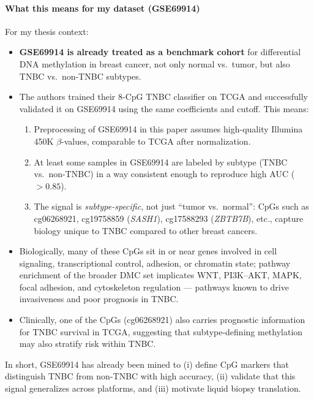 \documentclass[10pt]{extarticle}
\begin{document}
\paragraph{What this means for my dataset (GSE69914)}
For my thesis context:
\begin{itemize}[label=-]
    \item \textbf{GSE69914 is already treated as a benchmark cohort} for differential DNA methylation in breast cancer, not only normal vs.\ tumor, but also TNBC vs.\ non-TNBC subtypes.
    \item The authors trained their 8-CpG TNBC classifier on TCGA and successfully validated it on GSE69914 using the same coefficients and cutoff. This means:
    \begin{enumerate}
        \item Preprocessing of GSE69914 in this paper assumes high-quality Illumina 450K \(\beta\)-values, comparable to TCGA after normalization.
        \item At least some samples in GSE69914 are labeled by subtype (TNBC vs.\ non-TNBC) in a way consistent enough to reproduce high AUC (\(>0.85\)).
        \item The signal is \textit{subtype-specific}, not just ``tumor vs.\ normal'': CpGs such as cg06268921, cg19758859 (\textit{SASH1}), cg17588293 (\textit{ZBTB7B}), etc., capture biology unique to TNBC compared to other breast cancers.
    \end{enumerate}
    \item Biologically, many of these CpGs sit in or near genes involved in cell signaling, transcriptional control, adhesion, or chromatin state; pathway enrichment of the broader DMC set implicates WNT, PI3K--AKT, MAPK, focal adhesion, and cytoskeleton regulation --- pathways known to drive invasiveness and poor prognosis in TNBC.
    \item Clinically, one of the CpGs (cg06268921) also carries prognostic information for TNBC survival in TCGA, suggesting that subtype-defining methylation may also stratify risk within TNBC.
\end{itemize}
In short, GSE69914 has already been mined to (i) define CpG markers that distinguish TNBC from non-TNBC with high accuracy, (ii) validate that this signal generalizes across platforms, and (iii) motivate liquid biopsy translation. 
\end{document}
